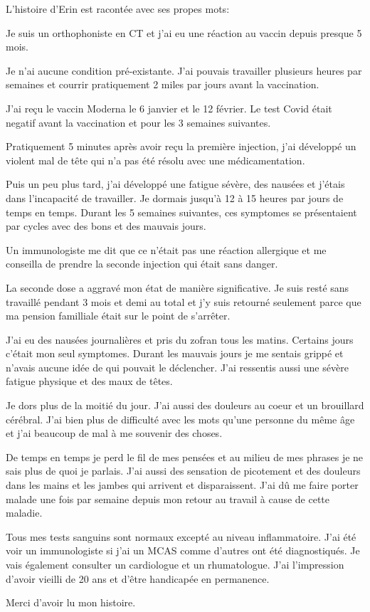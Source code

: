 L'histoire d'Erin est racontée avec ses propes mots:

Je suis un orthophoniste en CT et j'ai eu une réaction au vaccin depuis presque
5 mois.

Je n'ai aucune condition pré-existante. J'ai pouvais travailler plusieurs heures
par semaines et courrir pratiquement 2 miles par jours avant la vaccination.

J'ai reçu le vaccin Moderna le 6 janvier et le 12 février. Le test Covid était
negatif avant la vaccination et pour les 3 semaines suivantes.

Pratiquement 5 minutes après avoir reçu la première injection, j'ai développé un
violent mal de tête qui n'a pas été résolu avec une médicamentation.

Puis un peu plus tard, j'ai développé une fatigue sévère, des nausées et j'étais
dans l'incapacité de travailler. Je dormais jusqu'à 12 à 15 heures par jours de
temps en temps. Durant les 5 semaines suivantes, ces symptomes se présentaient
par cycles avec des bons et des mauvais jours.

Un immunologiste me dit que ce n'était pas une réaction allergique et me
conseilla de prendre la seconde injection qui était sans danger.

La seconde dose a aggravé mon état de manière significative. Je suis resté sans
travaillé pendant 3 mois et demi au total et j'y suis retourné seulement parce
que ma pension familliale était sur le point de s'arrêter.

J'ai eu des nausées journalières et pris du zofran tous les matins. Certains
jours c'était mon seul symptomes. Durant les mauvais jours je me sentais grippé
et n'avais aucune idée de qui pouvait le déclencher. J'ai ressentis aussi une
sévère fatigue physique et des maux de têtes.

Je dors plus de la moitié du jour. J'ai aussi des douleurs au coeur et un
brouillard cérébral. J'ai bien plus de difficulté avec les mots qu'une personne
du même âge et j'ai beaucoup de mal à me souvenir des choses.

De temps en temps je perd le fil de mes pensées et au milieu de mes phrases je
ne sais plus de quoi je parlais. J'ai aussi des sensation de picotement et des
douleurs dans les mains et les jambes qui arrivent et disparaissent. J'ai dû me
faire porter malade une fois par semaine depuis mon retour au travail à cause de
cette maladie.

Tous mes tests sanguins sont normaux excepté au niveau inflammatoire. J'ai été
voir un immunologiste si j'ai un MCAS comme d'autres ont été diagnostiqués. Je
vais également consulter un cardiologue et un rhumatologue. J'ai l'impression
d'avoir vieilli de 20 ans et d'être handicapée en permanence.

Merci d'avoir lu mon histoire.


